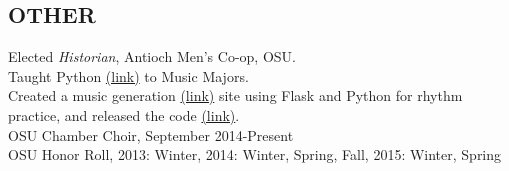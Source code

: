 \documentclass[line,margin]{res}
\begin{document}
\begin{resume}
\section{OTHER\\}             
            Elected {\it Historian}, Antioch Men's Co-op, OSU. \\
            Taught Python \href{https://github.com/fahlmant/LessonsForMusicMajors}{(link)} to Music Majors. \\
            Created a music generation \href{http://music.tfahl.com}{(link)} site using Flask and Python for rhythm practice,
            and released the code \href{https://github.com/fahlmant/RhythmGenerator}{(link)}.\\
            OSU Chamber Choir, September 2014-Present\\
            OSU Honor Roll, 2013: Winter, 2014: Winter, Spring, Fall, 2015: Winter, Spring\\

\end{resume}
\end{document}
